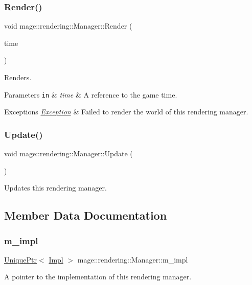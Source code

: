 \subsubsection{\texorpdfstring{Render()}{Render()}}
{\footnotesize\ttfamily void mage\+::rendering\+::\+Manager\+::\+Render (\begin{DoxyParamCaption}\item[{const \hyperlink{classmage_1_1_game_time}{Game\+Time} \&}]{time }\end{DoxyParamCaption})}

Renders.


\begin{DoxyParams}[1]{Parameters}
\mbox{\tt in}  & {\em time} & A reference to the game time. \\
\hline
\end{DoxyParams}

\begin{DoxyExceptions}{Exceptions}
{\em \hyperlink{classmage_1_1_exception}{Exception}} & Failed to render the world of this rendering manager. \\
\hline
\end{DoxyExceptions}
\hypertarget{classmage_1_1rendering_1_1_manager_a878849c66920ccef910b31c80b1f033c}{}\label{classmage_1_1rendering_1_1_manager_a878849c66920ccef910b31c80b1f033c} 
\subsubsection{\texorpdfstring{Update()}{Update()}}
{\footnotesize\ttfamily void mage\+::rendering\+::\+Manager\+::\+Update (\begin{DoxyParamCaption}{ }\end{DoxyParamCaption})}

Updates this rendering manager. 

\subsection{Member Data Documentation}
\hypertarget{classmage_1_1rendering_1_1_manager_a1fa26fd6393941f4ef9b6863f317cd29}{}\label{classmage_1_1rendering_1_1_manager_a1fa26fd6393941f4ef9b6863f317cd29} 
\subsubsection{\texorpdfstring{m\+\_\+impl}{m\_impl}}
{\footnotesize\ttfamily \hyperlink{namespacemage_a3316d7143a973e37adf1110f2e80ca31}{Unique\+Ptr}$<$ \hyperlink{classmage_1_1rendering_1_1_manager_1_1_impl}{Impl} $>$ mage\+::rendering\+::\+Manager\+::m\+\_\+impl\hspace{0.3cm}{\ttfamily [private]}}

A pointer to the implementation of this rendering manager. 